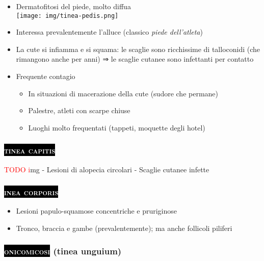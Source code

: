 \documentclass[italian,]{article}
\providecommand{\tightlist}{%
  \setlength{\itemsep}{0pt}\setlength{\parskip}{0pt}}
\newcommand{\pat}[1]{\colorbox{black}{\textcolor{white}{\textsc{#1}}}}
\newcommand{\TODO}[1]{\textcolor{red}{\textsf{\footnotesize{TODO #1}}}} %
\begin{document}
\begin{itemize}
\item
  Dermatofitosi del piede, molto diffua\\
  \texttt{[image: img/tinea-pedis.png]}
\item
  Interessa prevalentemente l'alluce (classico \emph{piede dell'atleta})
\item
  La cute si infiamma e si squama: le scaglie sono ricchissime di
  talloconidi (che rimangono anche per anni) ⇒ le scaglie cutanee sono
  infettanti per contatto
\item
  Frequente contagio

  \begin{itemize}
  \tightlist
  \item
    In situazioni di macerazione della cute (sudore che permane)
  \item
    Palestre, atleti con scarpe chiuse
  \item
    Luoghi molto frequentati (tappeti, moquette degli hotel)
  \end{itemize}
\end{itemize}

\hypertarget{section-1}{%
\subsubsection{\texorpdfstring{\pat{tinea capitis}}{}}\label{section-1}}

\TODO img - Lesioni di alopecia circolari - Scaglie cutanee infette

\hypertarget{section-2}{%
\subsubsection{\texorpdfstring{\pat{inea corporis}}{}}\label{section-2}}

\begin{itemize}
\tightlist
\item
  Lesioni papulo-squamose concentriche e pruriginose
\item
  Tronco, braccia e gambe (prevalentemente); ma anche follicoli piliferi
\end{itemize}

\hypertarget{tinea-unguium}{%
\subsubsection{\texorpdfstring{\pat{onicomicosi} (tinea
unguium)}{ (tinea unguium)}}\label{tinea-unguium}}
\end{document}
